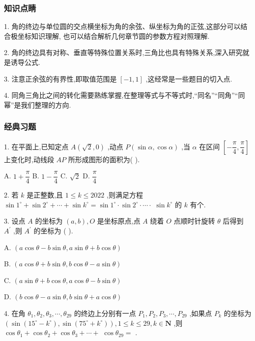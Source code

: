 \subsubsection*{知识点睛}

1. 角的终边与单位圆的交点横坐标为角的余弦、纵坐标为角的正弦,这部分可以结合极坐标知识理解, 也可以结合解析几何章节圆的参数方程对照理解.

2. 角的终边具有对称、垂直等特殊位置关系时,三角比也具有特殊关系,深入研究就是诱导公式.

3. 注意正余弦的有界性,即取值范围是 $\left\lbrack  {-1,1}\right\rbrack$ ,这经常是一些题目的切入点.

4. 同角三角比之间的转化需要熟练掌握,在整理等式与不等式时,“同名”“同角”“同幂”是我们整理的方向.

\subsubsection*{经典习题}

1. 在平面上,已知定点 $A\left( {\sqrt{2},0}\right)$ ,动点 $P\left( {\sin \alpha ,\cos \alpha }\right)$ ,当 $\alpha$ 在区间 $\left\lbrack  {-\dfrac{\pi }{4},\dfrac{\pi }{4}}\right\rbrack$ 上变化时,动线段 ${AP}$ 所形成图形的面积为(   ).

A. $1 + \dfrac{\pi }{4}$ B. $1 - \dfrac{\pi }{4}$ C. $\sqrt{2}$ D. $\dfrac{\pi }{4}$

2. 若 $k$ 是正整数,且 $1 \leq  k \leq  {2022}$ ,则满足方程 $\sin {1}^{ \circ  } + \sin {2}^{ \circ  } + \cdots  + \sin {k}^{ \circ  } = \sin {1}^{ \circ  } \cdot  \sin {2}^{ \circ  } \cdot  \cdots  \cdot$  $\sin {k}^{ \circ  }$ 的 $k$ 有\blkda{}个.

3. 设点 $A$ 的坐标为 $\left( {a,b}\right) ,O$ 是坐标原点,点 $A$ 绕着 $O$ 点顺时针旋转 $\theta$ 后得到 ${A}^{\prime }$ ,则 ${A}^{\prime }$ 的坐标为 (   ).

A. $\left( {a\cos \theta  - b\sin \theta ,a\sin \theta  + b\cos \theta }\right)$

B. $\left( {a\cos \theta  + b\sin \theta ,b\cos \theta  - a\sin \theta }\right)$

C. $\left( {a\sin \theta  + b\cos \theta ,a\cos \theta  - b\sin \theta }\right)$

D. $\left( {b\cos \theta  - a\sin \theta ,b\sin \theta  + a\cos \theta }\right)$

4. 在角 ${\theta }_{1},{\theta }_{2},{\theta }_{3},\cdots ,{\theta }_{29}$ 的终边上分别有一点 ${P}_{1},{P}_{2},{P}_{3},\cdots ,{P}_{29}$ ,如果点 ${P}_{k}$ 的坐标为 $\left( {\sin \left( {{15}^{ \circ  } - {k}^{ \circ  }}\right) ,\sin \left( {{75}^{ \circ  } + {k}^{ \circ  }}\right) }\right) ,1 \leq  k \leq  {29},k \in  \mathbf{N}$ ,则 $\cos {\theta }_{1} + \cos {\theta }_{2} + \cos {\theta }_{3} + \cdots  +$  $\cos {\theta }_{29} =$ \blkda{}.

